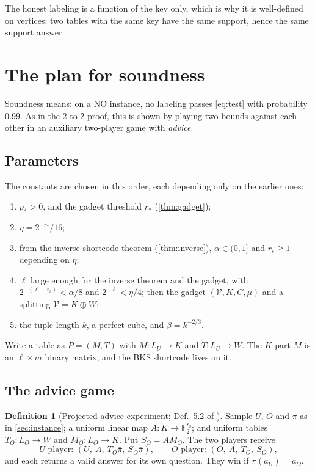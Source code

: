 \documentclass[11pt]{article}
\theoremstyle{definition}
\newtheorem{definition}[theorem]{Definition}
\theoremstyle{remark}
\newcommand{\F}{\mathbb F}
\newcommand{\V}{\mathcal V}
\newcommand{\rs}{r_{\mathrm s}}
\newcommand{\bpi}{\bar\pi}
\begin{document}
The honest labeling is a function of the key only, which is why it is
well-defined on vertices: two tables with the same key have the same support,
hence the same support answer.

\section{The plan for soundness}\label{sec:plan}

Soundness means: on a NO instance, no labeling passes \eqref{eq:test} with
probability $0.99$. As in the 2-to-2 proof, this is shown by playing two bounds
against each other in an auxiliary two-player game with \emph{advice}.

\subsection{Parameters}

The constants are chosen in this order, each depending only on the earlier ones:
\begin{enumerate}
\item $p_*>0$, and the gadget threshold $r_*$ (\cref{thm:gadget});
\item $\eta=2^{-r_*}/16$;
\item from the inverse shortcode theorem (\cref{thm:inverse}), $\alpha\in(0,1]$
  and $\rs\ge1$ depending on $\eta$;
\item $\ell$ large enough for the inverse theorem and the gadget, with
  $2^{-(\ell-\rs)}<\alpha/8$ and $2^{-\ell}<\eta/4$; then the gadget
  $(\V,K,C,\mu)$ and a splitting $\V=K\oplus W$;
\item the tuple length $k$, a perfect cube, and $\beta=k^{-2/3}$.
\end{enumerate}
Write a table as $P=(M,T)$ with $M\colon L_U\to K$ and $T\colon L_U\to W$. The
$K$-part $M$ is an $\ell\times m$ binary matrix, and the BKS shortcode lives
on it.

\subsection{The advice game}

\begin{definition}[Projected advice experiment; Def.~5.2 of \cite{OpenAI-UGC}]\label{def:advice}
Sample $U$, $O$ and $\bpi$ as in \cref{sec:instance}; a uniform linear map
$A\colon K\to\F_2^{\rs}$; and uniform tables $T_O\colon L_O\to W$ and
$M_O\colon L_O\to K$. Put $S_O=AM_O$. The two players receive
\[
\text{$U$-player: }(U,\ A,\ T_O\bpi,\ S_O\bpi),\qquad
\text{$O$-player: }(O,\ A,\ T_O,\ S_O),
\]
and each returns a valid answer for its own question. They win if
$\bpi(a_U)=a_O$.
\end{definition}
\end{document}
